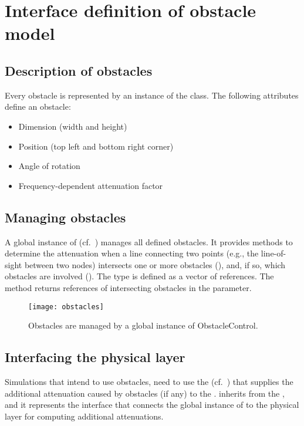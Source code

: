 \section{Interface definition of obstacle model}

\subsection{Description of obstacles}

Every obstacle is represented by an instance of the 
class. The following attributes define an obstacle:

\begin{itemize}
\item Dimension (width and height)
\item Position (top left and bottom right corner)
\item Angle of rotation
\item Frequency-dependent attenuation factor
\end{itemize}

\subsection{Managing obstacles}

A global instance of  (cf.~)
manages all defined obstacles. It provides methods to determine the
attenuation when a line connecting two points (e.g., the line-of-sight
between two nodes) intersects one or more obstacles
(), and, if so, which obstacles are involved
(). The  type is
defined as a vector of  references. The method returns
references of intersecting obstacles in the  parameter.

\begin{figure}
  \centering
  \texttt{[image: obstacles]}
  \caption{Obstacles are managed by a global instance of
    ObstacleControl.}
  \label{fig:obstacles}
\end{figure}


\subsection{Interfacing the physical layer}

Simulations that intend to use obstacles, need to use the
 (cf.~) that supplies the
additional attenuation caused by obstacles (if any) to the
.   inherits from the
, and it represents the interface that connects
the global instance of  to the physical layer
for computing additional attenuations.

